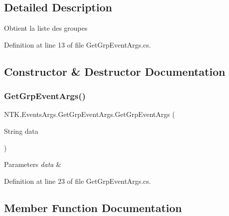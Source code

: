 \subsection{Detailed Description}
Obtient la liste des groupes 



Definition at line 13 of file Get\+Grp\+Event\+Args.\+cs.



\subsection{Constructor \& Destructor Documentation}
\mbox{\label{class_n_t_k_1_1_events_args_1_1_get_grp_event_args_a1ff8371f075d13b1f032bc928c0dd8e7}} 
\subsubsection{\texorpdfstring{GetGrpEventArgs()}{GetGrpEventArgs()}}
{\footnotesize\ttfamily N\+T\+K.\+Events\+Args.\+Get\+Grp\+Event\+Args.\+Get\+Grp\+Event\+Args (\begin{DoxyParamCaption}\item[{String}]{data }\end{DoxyParamCaption})}






\begin{DoxyParams}{Parameters}
{\em data} & \\
\hline
\end{DoxyParams}


Definition at line 23 of file Get\+Grp\+Event\+Args.\+cs.



\subsection{Member Function Documentation}
\mbox{\label{class_n_t_k_1_1_events_args_1_1_get_grp_event_args_acead1ffdc63c51367c99979f5fd27c86}} 
